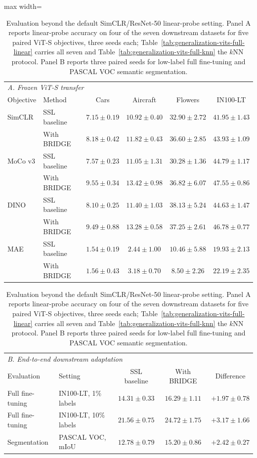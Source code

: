 \begin{table}[t]
\centering
\small
\setlength{\tabcolsep}{5pt}
\caption{Evaluation beyond the default SimCLR/ResNet-50 linear-probe setting. Panel A reports linear-probe accuracy on four of the seven downstream datasets for five paired ViT-S objectives, three seeds each; Table~\ref{tab:generalization-vits-full-linear} carries all seven and Table~\ref{tab:generalization-vits-full-knn} the $k$NN protocol. Panel B reports three paired seeds for low-label full fine-tuning and PASCAL VOC semantic segmentation.}
\label{tab:main_generalization}
\begin{adjustbox}{max width=\linewidth}
\begin{tabular}{llcccc}
\toprule
\multicolumn{6}{l}{\textit{A. Frozen ViT-S transfer}} \\
Objective & Method & Cars & Aircraft & Flowers & IN100-LT \\
\midrule
SimCLR & SSL baseline & $7.15\pm0.19$ & $10.92\pm0.40$ & $32.90\pm2.72$ & $41.95\pm1.43$ \\
 & With BRIDGE & $\mathbf{8.18\pm0.42}$ & $\mathbf{11.82\pm0.43}$ & $\mathbf{36.60\pm2.85}$ & $\mathbf{43.93\pm1.09}$ \\
MoCo v3 & SSL baseline & $7.57\pm0.23$ & $11.05\pm1.31$ & $30.28\pm1.36$ & $44.79\pm1.17$ \\
 & With BRIDGE & $\mathbf{9.55\pm0.34}$ & $\mathbf{13.42\pm0.98}$ & $\mathbf{36.82\pm6.07}$ & $\mathbf{47.55\pm0.86}$ \\
DINO & SSL baseline & $8.10\pm0.25$ & $11.40\pm1.03$ & $\mathbf{38.13\pm5.24}$ & $44.63\pm1.47$ \\
 & With BRIDGE & $\mathbf{9.49\pm0.88}$ & $\mathbf{13.28\pm0.58}$ & $37.25\pm2.61$ & $\mathbf{46.78\pm0.77}$ \\
MAE & SSL baseline & $1.54\pm0.19$ & $2.44\pm1.00$ & $\mathbf{10.46\pm5.88}$ & $19.93\pm2.13$ \\
 & With BRIDGE & $\mathbf{1.56\pm0.43}$ & $\mathbf{3.18\pm0.70}$ & $8.50\pm2.26$ & $\mathbf{22.19\pm2.35}$ \\
\bottomrule
\end{tabular}

\vspace{4pt}

\begin{tabular}{llccc}
\toprule
\multicolumn{5}{l}{\textit{B. End-to-end downstream adaptation}} \\
Evaluation & Setting & SSL baseline & With BRIDGE & Difference \\
\midrule
Full fine-tuning & IN100-LT, 1\% labels & $14.31\pm0.33$ & $16.29\pm1.11$ & $+1.97\pm0.78$ \\
Full fine-tuning & IN100-LT, 10\% labels & $21.56\pm0.75$ & $24.72\pm1.75$ & $+3.17\pm1.66$ \\
Segmentation & PASCAL VOC, mIoU & $12.78\pm0.79$ & $15.20\pm0.86$ & $+2.42\pm0.27$ \\
\bottomrule
\end{tabular}
\end{adjustbox}
\end{table}
